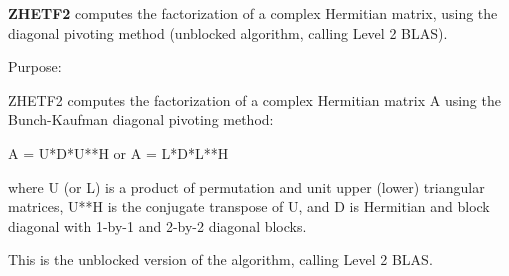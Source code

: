 {\bfseries Z\+H\+E\+T\+F2} computes the factorization of a complex Hermitian matrix, using the diagonal pivoting method (unblocked algorithm, calling Level 2 B\+L\+A\+S). 

 \begin{DoxyParagraph}{Purpose\+: }
\begin{DoxyVerb} ZHETF2 computes the factorization of a complex Hermitian matrix A
 using the Bunch-Kaufman diagonal pivoting method:

    A = U*D*U**H  or  A = L*D*L**H

 where U (or L) is a product of permutation and unit upper (lower)
 triangular matrices, U**H is the conjugate transpose of U, and D is
 Hermitian and block diagonal with 1-by-1 and 2-by-2 diagonal blocks.

 This is the unblocked version of the algorithm, calling Level 2 BLAS.\end{DoxyVerb}
 
\end{DoxyParagraph}

